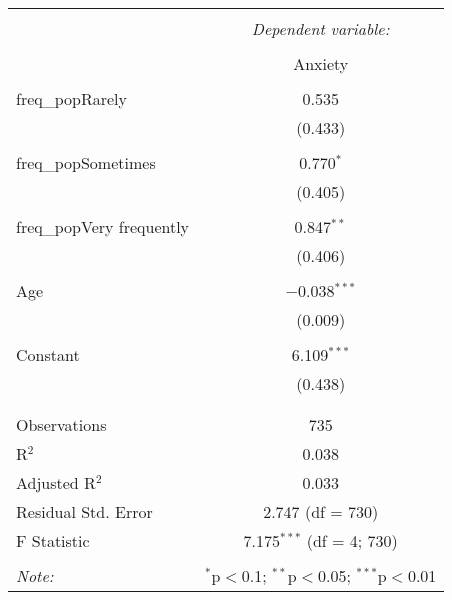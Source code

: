 \documentclass{article}
\begin{document}
\begin{table}[!htbp] \centering 
  \caption{} 
  \label{} 
\begin{tabular}{@{\extracolsep{5pt}}lc} 
\\[-1.8ex]\hline 
\hline \\[-1.8ex] 
 & \multicolumn{1}{c}{\textit{Dependent variable:}} \\ 
\cline{2-2} 
\\[-1.8ex] & Anxiety \\ 
\hline \\[-1.8ex] 
 freq\_popRarely & 0.535 \\ 
  & (0.433) \\ 
  & \\ 
 freq\_popSometimes & 0.770$^{*}$ \\ 
  & (0.405) \\ 
  & \\ 
 freq\_popVery frequently & 0.847$^{**}$ \\ 
  & (0.406) \\ 
  & \\ 
 Age & $-$0.038$^{***}$ \\ 
  & (0.009) \\ 
  & \\ 
 Constant & 6.109$^{***}$ \\ 
  & (0.438) \\ 
  & \\ 
\hline \\[-1.8ex] 
Observations & 735 \\ 
R$^{2}$ & 0.038 \\ 
Adjusted R$^{2}$ & 0.033 \\ 
Residual Std. Error & 2.747 (df = 730) \\ 
F Statistic & 7.175$^{***}$ (df = 4; 730) \\ 
\hline 
\hline \\[-1.8ex] 
\textit{Note:}  & \multicolumn{1}{r}{$^{*}$p$<$0.1; $^{**}$p$<$0.05; $^{***}$p$<$0.01} \\ 
\end{tabular} 
\end{table} 
\end{document}

